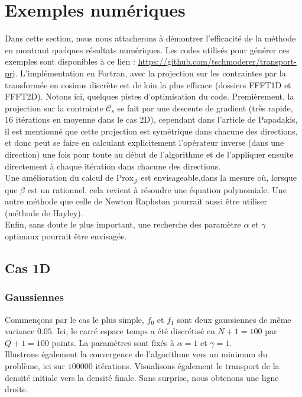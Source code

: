 \documentclass[a4paper,12pt]{article}
\newcommand{\prox}{\text{Prox}}
\begin{document}
\section{Exemples numériques}
Dans cette section, nous nous attacherons à démontrer l'efficacité de la méthode en montrant quelques résultats numériques. 
Les codes utilisés pour générer ces exemples sont disponibles à ce lien : \url{https://github.com/tschmoderer/transport-prj}. L'implémentation en Fortran, avec la projection sur les contraintes par la transformée en cosinus discrète est de loin la plus efficace (dossiers FFFT1D et FFFT2D). Notons ici, quelques pistes d'optimisation du code. Premièrement, la projection sur la contrainte $\mathcal{C}_s$ se fait par une descente de gradient (très rapide, 16 itérations en moyenne dans le cas 2D), cependant dans l'article de Papadakis, il est mentionné que cette projection est symétrique dans chacune des directions, et donc peut se faire en calculant explicitement l'opérateur inverse (dans une direction) une fois pour toute au début de l'algorithme et de l'appliquer ensuite directement à chaque itération dans chacune des directions. \\
Une amélioration du calcul de $\prox_{\mathcal{J}}$ est envisageable,dans la mesure où, lorsque que $\beta$ est un rationnel, cela revient à résoudre une équation polynomiale. Une autre méthode que celle de Newton Raphston pourrait aussi être utiliser (méthode de Hayley). \\
Enfin, sans doute le plus important, une recherche des paramètre $\alpha$ et $\gamma$ optimaux pourrait être envisagée. 
\newpage
\subsection{Cas 1D}
\subsubsection{Gaussiennes}
Commençons par le cas le plus simple, $f_0$ et $f_1$ sont deux gaussiennes de même variance $0.05$. Ici, le carré espace temps a été discrétisé en $N +1=100$ par $Q+1=100$ points. La paramètres sont fixés à $\alpha = 1$ et $\gamma = 1$.\\
Illustrons également la convergence de l'algorithme vers un minimum du problème, ici sur $100000$ itérations. Visualisons également le transport de la densité initiale vers la densité finale. Sans surprise, nous obtenons une ligne droite.
\end{document}
